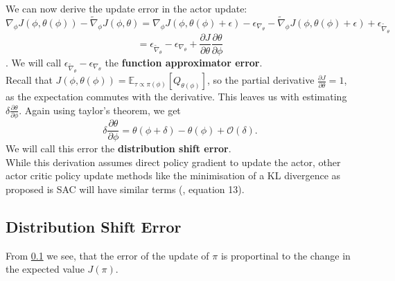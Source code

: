 We can now derive the update error in the actor update:
\begin{equation}
    \label{equation:general_update_error}
    \nabla_{\phi} J(\phi, \theta(\phi)) - \widetilde{\nabla}_\phi J(\phi, \theta) = \nabla_{\phi} J(\phi, \theta(\phi) + \epsilon) - \epsilon_{\nabla_{\theta}} - \widetilde{\nabla}_\phi J(\phi, \theta(\phi) + \epsilon) + \epsilon_{\widetilde{\nabla}_{\theta}}
\end{equation}
\begin{equation*}
    = \epsilon_{\widetilde{\nabla}_{\theta}} - \epsilon_{\nabla_{\theta}} + \frac{\partial J}{\partial \theta} \frac{\partial \theta}{\partial \phi}
\end{equation*}
. We will call $\epsilon_{\widetilde{\nabla}_{\theta}} - \epsilon_{\nabla_{\theta}}$ the  \textbf{function approximator error}. \\
Recall that $J(\phi, \theta(\phi)) = \mathbb{E}_{\tau \propto \pi(\phi)}\left[Q_{\theta(\phi)}\right]$, so the partial derivative $\frac{\partial J}{\partial \theta} = 1$, 
as the expectation commutes with the derivative. This leaves us with estimating $\delta \frac{\partial \theta}{\partial \phi}$. Again using taylor's theorem, we get 
\begin{equation}
    \label{dist_shift_error}
    \delta \frac{\partial \theta}{\partial \phi} = \theta(\phi + \delta) - \theta(\phi) + \mathcal{O}(\delta).
\end{equation}
We will call this error the \textbf{distribution shift error}.\\
While this derivation assumes direct policy gradient to update the actor, other actor critic policy update methods like the minimisation of a KL divergence as 
proposed is SAC will have similar terms (\cite{SAC}, equation 13).

\subsection{Distribution Shift Error}
\label{dist_shift_error}
From \ref{dist_shift_error} we see, that the error of the update of $\pi$ is proportinal to the change in the 
expected value $J(\pi)$.\\ 


